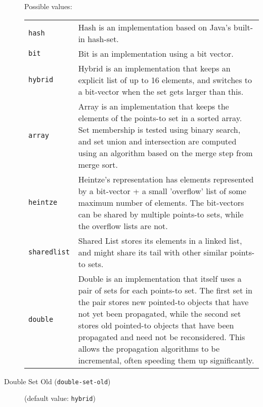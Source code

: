 \documentclass{article}
\begin{document}
\begin{description}
Possible values:\\
\begin{longtable}{p{1in}p{4in}}

{\tt hash }
&

Hash is an implementation based on Java's built-in hash-set.
\\

{\tt bit }
&

Bit is an implementation using a bit vector.
\\

{\tt hybrid }
&

Hybrid is an implementation that keeps an explicit list of up to
16 elements, and switches to a bit-vector when the set gets
larger than this.
\\

{\tt array }
&

Array is an implementation that keeps the elements of the
points-to set in a sorted array. Set membership is tested using
binary search, and set union and intersection are computed using
an algorithm based on the merge step from merge sort.
\\

{\tt heintze }
&
Heintze's representation has elements represented by a bit-vector + a small
									'overflow' list of some maximum number of elements.  The bit-vectors can be shared
									by multiple points-to sets, while the overflow lists are not.
								\\

{\tt sharedlist }
&
Shared List stores its elements in a linked list, and might share
									its tail with other similar points-to sets.
								\\

{\tt double }
&

Double is an implementation that itself uses a pair of sets for
each points-to set. The first set in the pair stores new pointed-to
objects that have not yet been propagated, while the second set stores
old pointed-to objects that have been propagated and need not be
reconsidered. This allows the propagation algorithms to be incremental,
often speeding them up significantly.
\\

\end{longtable}


\item[Double Set Old ({\tt double-set-old})]
(default value: {\tt hybrid})





\end{description}
\end{document}
